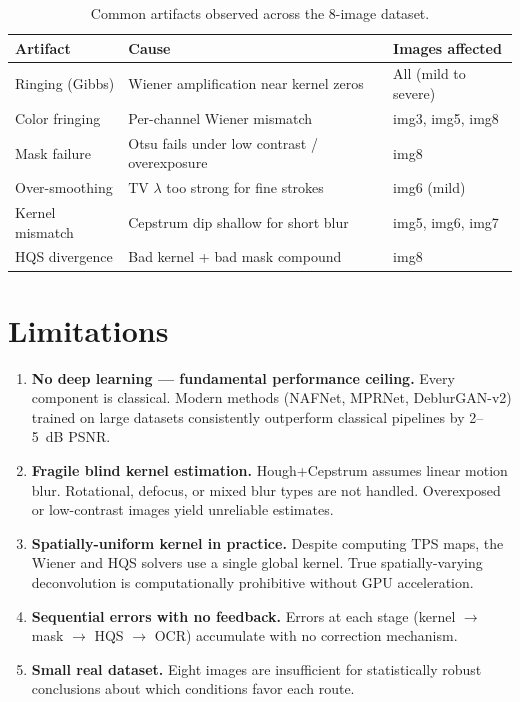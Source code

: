 \documentclass[12pt,a4paper]{article}
\begin{document}
\begin{table}[H]
  \centering
  \caption{Common artifacts observed across the 8-image dataset.}
  \label{tab:artifacts}
  \small
  \begin{tabular}{@{}lll@{}}
    \toprule
    \textbf{Artifact} & \textbf{Cause} & \textbf{Images affected} \\
    \midrule
    Ringing (Gibbs)   & Wiener amplification near kernel zeros          & All (mild to severe) \\
    Color fringing    & Per-channel Wiener mismatch                     & img3, img5, img8 \\
    Mask failure      & Otsu fails under low contrast / overexposure    & img8 \\
    Over-smoothing    & TV $\lambda$ too strong for fine strokes         & img6 (mild) \\
    Kernel mismatch   & Cepstrum dip shallow for short blur              & img5, img6, img7 \\
    HQS divergence    & Bad kernel + bad mask compound                  & img8 \\
    \bottomrule
  \end{tabular}
\end{table}

\section{Limitations}

\begin{enumerate}[noitemsep, topsep=2pt]
  \item \textbf{No deep learning --- fundamental performance ceiling.}
    Every component is classical. Modern methods (NAFNet, MPRNet, DeblurGAN-v2) trained
    on large datasets consistently outperform classical pipelines by 2--5~dB PSNR.

  \item \textbf{Fragile blind kernel estimation.}
    Hough+Cepstrum assumes linear motion blur. Rotational, defocus, or mixed blur types
    are not handled. Overexposed or low-contrast images yield unreliable estimates.

  \item \textbf{Spatially-uniform kernel in practice.}
    Despite computing TPS maps, the Wiener and HQS solvers use a single global kernel.
    True spatially-varying deconvolution is computationally prohibitive without GPU
    acceleration.

  \item \textbf{Sequential errors with no feedback.}
    Errors at each stage (kernel $\to$ mask $\to$ HQS $\to$ OCR) accumulate with no
    correction mechanism.

  \item \textbf{Small real dataset.}
    Eight images are insufficient for statistically robust conclusions about which
    conditions favor each route.
\end{enumerate}
\end{document}
